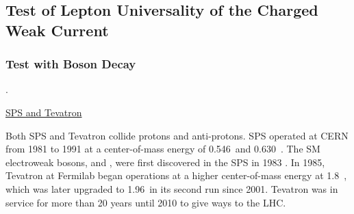 \subsection{Test of Lepton Universality of the Charged Weak Current}
\label{sec:relatedWorks:lu}


\subsubsection{Test with \PW Boson Decay} 
\label{sec:relatedWorks:lu:W}

.




\underline{SPS and Tevatron}

Both SPS and Tevatron collide protons and anti-protons. SPS operated at CERN from 1981 to 1991 at a center-of-mass energy of 0.546~\TeV and 0.630~\TeV. The SM electroweak bosons, \PW and \PZ, were first discovered in the SPS in 1983 \cite{ARNISON1983103, BANNER1983476}. In 1985, Tevatron at Fermilab began operations at a higher center-of-mass energy at 1.8~\TeV, which was later upgraded to 1.96~\TeV in its second run since 2001. Tevatron was in service for more than 20 years until 2010 to give ways to the LHC. 


